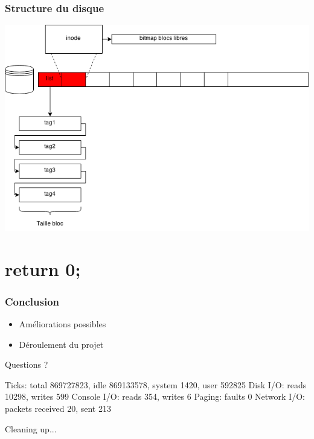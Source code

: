 \documentclass{beamer}
\begin{document}
\begin{frame}
  \frametitle{Structure du disque}
  \begin{center}
  \includegraphics[scale=0.4]{fs_struct.png}
  \end{center}
\end{frame}

\section*{return 0;}

\begin{frame}[fragile]
  \frametitle{Conclusion}
  \begin{itemize}
  \item Améliorations possibles
  \item Déroulement du projet
  \end{itemize}
\begin{verbaterm}[fontsize=\scriptsize]
Questions ?

Ticks: total 869727823, idle 869133578, system 1420, user 592825
Disk I/O: reads 10298, writes 599
Console I/O: reads 354, writes 6
Paging: faults 0
Network I/O: packets received 20, sent 213

Cleaning up...
\end{verbaterm}

\end{frame}
\end{document}
